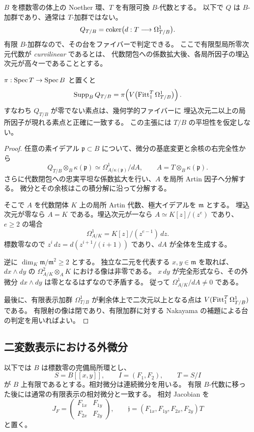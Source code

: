 $B$ を標数零の体上の Noether 環、$T$ を有限可換 $B$-代数とする。
以下で $Q$ は $B$-加群であり、通常は $T$-加群ではない。
\[
Q_{T/B}=\operatorname{coker}\bigl(d:T\longrightarrow\Omega^1_{T/B}\bigr).
\]
有限 $B$-加群なので、その台をファイバーで判定できる。
ここで有限型局所零次元代数が \emph{curvilinear} であるとは、
代数閉包への係数拡大後、各局所因子の埋込次元が高々一であることとする。

\begin{theorem}[微分余核の台]\label{thm:support}
$\pi:\operatorname{Spec} T\to\operatorname{Spec} B$ と置くと
\[
\operatorname{Supp}_B Q_{T/B}
=\pi\!\left(V\bigl(\operatorname{Fitt}_1^T\Omega^1_{T/B}\bigr)\right).
\]
すなわち $Q_{T/B}$ が零でない素点は、幾何学的ファイバーに
埋込次元二以上の局所因子が現れる素点と正確に一致する。
この主張には $T/B$ の平坦性を仮定しない。
\end{theorem}

\begin{proof}
任意の素イデアル $\mathfrak p\subset B$ について、微分の基底変更と余核の右完全性から
\[
Q_{T/B}\otimes_B\kappa(\mathfrak p)
\simeq
\Omega^1_{A/\kappa(\mathfrak p)}/dA,
\qquad A=T\otimes_B\kappa(\mathfrak p).
\]
さらに代数閉包への忠実平坦な係数拡大を行い、$A$ を局所 Artin 因子へ分解する。
微分とその余核はこの積分解に沿って分解する。

そこで $A$ を代数閉体 $K$ 上の局所 Artin 代数、極大イデアルを $\mathfrak m$ とする。
埋込次元が零なら $A=K$ である。埋込次元が一なら
$A\simeq K[z]/(z^e)$ であり、$e\ge2$ の場合
\[
\Omega^1_{A/K}=K[z]/(z^{e-1})\,dz.
\]
標数零なので $z^i\,dz=d(z^{i+1}/(i+1))$ であり、$dA$ が全体を生成する。

逆に $\dim_K\mathfrak m/\mathfrak m^2\ge2$ とする。
独立な二元を代表する $x,y\in\mathfrak m$ を取れば、
$dx\wedge dy$ の $\Omega^2_{A/K}\otimes_A K$ における像は非零である。
$x\,dy$ が完全形式なら、その外微分 $dx\wedge dy$ は零となるはずなので矛盾する。
従って $\Omega^1_{A/K}/dA\ne0$ である。

最後に、有限表示加群 $\Omega^1_{T/B}$ が剰余体上で二次元以上となる点は
$V(\operatorname{Fitt}_1^T\Omega^1_{T/B})$ である。
有限射の像は閉であり、有限加群に対する Nakayama の補題による台の判定を用いればよい。
\end{proof}

\subsection{二変数表示における外微分}

以下では $B$ は標数零の完備局所環とし、
\[
S=B[[x,y]],\qquad I=(F_1,F_2),\qquad T=S/I
\]
が $B$ 上有限であるとする。相対微分は連続微分を用いる。
有限 $B$-代数に移った後には通常の有限表示の相対微分と一致する。
相対 Jacobian を
\[
J_F=\begin{pmatrix}F_{1x}&F_{1y}\\F_{2x}&F_{2y}\end{pmatrix},
\qquad
\mathfrak j=(F_{1x},F_{1y},F_{2x},F_{2y})T
\]
と置く。

